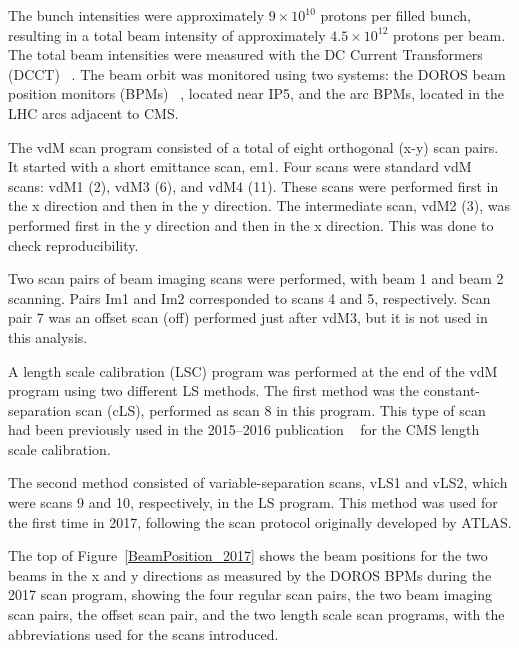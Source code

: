 The bunch intensities were approximately \(9 \times 10^{10}\) protons per filled bunch, resulting in a total beam intensity of approximately \(4.5 \times 10^{12}\) protons per beam. The total beam intensities were measured with the DC Current Transformers (DCCT) ~\citep{LHC_DCCT_calibration}.  The beam orbit was monitored using two systems: the DOROS beam position monitors (BPMs) ~\citep{BPM__electronics}, located near IP5, and the arc BPMs, located in the LHC arcs adjacent to CMS.  

The vdM scan program consisted of a total of eight orthogonal (x-y) scan pairs. It started with a short emittance scan, em1. Four scans were standard vdM scans: vdM1 (2), vdM3 (6), and vdM4 (11). These scans were performed first in the x direction and then in the y direction. The intermediate scan, vdM2 (3), was performed first in the y direction and then in the x direction. This was done to check reproducibility.  

Two scan pairs of beam imaging scans were performed, with beam 1 and beam 2 scanning. Pairs Im1 and Im2 corresponded to scans 4 and 5, respectively. Scan pair 7 was an offset scan (off) performed just after vdM3, but it is not used in this analysis.  

A length scale calibration (LSC) program was performed at the end of the vdM program using two different LS methods. The first method was the constant-separation scan (cLS), performed as scan 8 in this program. This type of scan had been previously used in the 2015–2016 publication  ~\citep{lumi_precise_2015_2016} for the CMS length scale calibration.

The second method consisted of variable-separation scans, vLS1 and vLS2, which were scans 9 and 10, respectively, in the LS program. This method was used for the first time in 2017, following the scan protocol originally developed by ATLAS.  

The top of Figure~\ref{BeamPosition_2017} shows the beam positions for the two beams in the x and y directions as measured by the DOROS BPMs during the 2017 scan program, showing the four regular scan pairs, the two beam imaging scan pairs, the offset scan pair, and the two length scale scan programs, with the abbreviations used for the scans introduced.  

